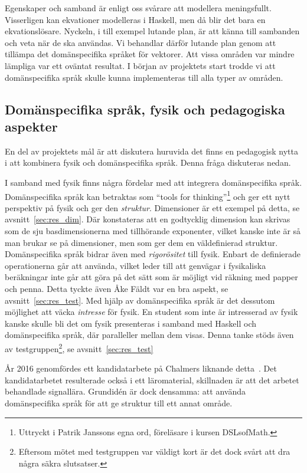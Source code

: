 Egenskaper och samband är enligt oss svårare att modellera meningsfullt. Visserligen kan ekvationer modelleras i Haskell, men då blir det bara en ekvationslösare. Nyckeln, i till exempel lutande plan, är att känna till sambanden och veta när de ska användas. Vi behandlar därför lutande plan genom att tillämpa det domänspecifika språket för vektorer. Att vissa områden var mindre lämpliga var ett oväntat resultat. I början av projektets start trodde vi att domänspecifika språk skulle kunna implementeras till alla typer av områden.

\subsection{Domänspecifika språk, fysik och pedagogiska aspekter}\label{sec:bara_fysik}

En del av projektets mål är att diskutera huruvida det finns en pedagogisk nytta i att kombinera fysik och domänspecifika språk. Denna fråga diskuteras nedan.

I samband med fysik finns några fördelar med att integrera domänspecifika språk. Domänspecifika språk kan betraktas som ``tools for thinking''\footnote{Uttryckt i Patrik Janssons egna ord, föreläsare i kursen DSLsofMath.} och ger ett nytt perspektiv på fysik och ger den \textit{struktur}. Dimensioner är ett exempel på detta, se avsnitt~\ref{sec:res_dim}. Där konstateras att en godtycklig dimension kan skrivas som de sju basdimensionerna med tillhörande exponenter, vilket kanske inte är så man brukar se på dimensioner, men som ger dem en väldefinierad struktur. Domänspecifika språk bidrar även med \textit{rigorösitet} till fysik. Enbart de definierade operationerna går att använda, vilket leder till att genvägar i fysikaliska beräkningar inte går att göra på det sätt som är möjligt vid räkning med papper och penna. Detta tyckte även Åke Fäldt var en bra aspekt, se avsnitt~\ref{sec:res_test}. Med hjälp av domänspecifika språk är det dessutom möjlighet att väcka \textit{intresse} för fysik. En student som inte är intresserad av fysik kanske skulle bli det om fysik presenteras i samband med Haskell och domänspecifika språk, där paralleller mellan dem visas. Denna tanke stöds även av testgruppen\footnote{Eftersom mötet med testgruppen var väldigt kort är det dock svårt att dra några säkra slutsatser.}, se avsnitt~\ref{sec:res_test}

År 2016 genomfördes ett kandidatarbete på Chalmers liknande
detta~\cite{kandidat2016}. Det kandidatarbetet resulterade också i ett
läromaterial, skillnaden är att det arbetet behandlade signallära. Grundidén är
dock densamma: att använda domänspecifika språk för att ge struktur till ett
annat område.

